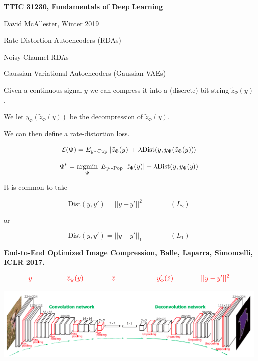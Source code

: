 





{\Huge

  \centerline{\bf TTIC 31230, Fundamentals of Deep Learning}
  \bigskip
  \centerline{David McAllester, Winter 2019}
  \vfill
  \centerline{Rate-Distortion Autoencoders (RDAs)}
  \vfill
  \centerline{Noisy Channel RDAs}
  \vfill
  \centerline{Gaussian Variational Autoencoders (Gaussian VAEs)}


Given a continuous signal $y$ we can compress it into a (discrete) bit string $\tilde{z}_\Phi(y)$.

\vfill
We let $y_\Phi(\tilde{z}_\Phi(y))$ be the decompression of $\tilde{z}_\Phi(y)$.

\vfill
We can then define a rate-distortion loss.

{\color{red} $${\cal L}(\Phi) = E_{y \sim \mathrm{Pop}}\;|\tilde{z}_\Phi(y)| + \lambda \mathrm{Dist}(y,y_\Phi(\tilde{z}_\Phi(y)))$$}


$$\Phi^* = \operatorname*{argmin}_\Phi\;E_{y \sim \mathrm{Pop}}\;|\tilde{z}_\Phi(y)| + \lambda \mathrm{Dist}(y,y_\Phi(y))$$

\vfill
It is common to take

$$\mathrm{Dist}(y,y') = ||y-y'||^2 \hspace{4em}(L_2)$$

\vfill
or

$$\mathrm{Dist}(y,y') = ||y-y'||_1 \hspace{4em} (L_1)$$


{\bf End-to-End Optimized Image Compression, Balle, Laparra, Simoncelli, ICLR 2017.}


\vfill
$${\color{red}y \hspace{5em}  \tilde{z}_\Psi(y) \hspace{4em} \tilde{z} \hspace{6em} y'_\Phi(\tilde{z}) \hspace{4em}||y - y'||^2}$$
\centerline{\includegraphics[width=9in]{../images/Deconv}}

}
